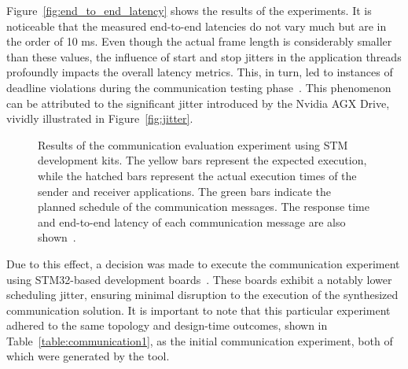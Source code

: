     Figure~\ref{fig:end_to_end_latency} shows the results of the experiments. It is noticeable that the measured end-to-end latencies do not vary much but are in the order of 10 ms.
    Even though the actual frame length is considerably smaller than these values, the influence of start and stop jitters in the application threads profoundly impacts the overall latency metrics. This, in turn, led to instances of deadline violations during the communication testing phase~\cite{askaripoor2023designer}. This phenomenon can be attributed to the significant jitter introduced by the Nvidia AGX Drive, vividly illustrated in Figure~\ref{fig:jitter}.
         \begin{figure}[b!]
	\centering
	\caption{Results of the communication evaluation experiment using STM development kits. The yellow bars represent the expected execution, while the hatched bars represent the actual execution times of the sender and receiver applications. The green bars indicate the planned schedule of the communication messages. The response time and end-to-end latency of each communication message are also shown~\cite{askaripoor2023designer}.}
	\label{fig:end_to_end_latency1}
    \end{figure}
    
    Due to this effect, a decision was made to execute the communication experiment using STM32-based development boards~\cite{STM}. These boards exhibit a notably lower scheduling jitter, ensuring minimal disruption to the execution of the synthesized communication solution. It is important to note that this particular experiment adhered to the same topology and design-time outcomes, shown in Table~\ref{table:communication1}, as the initial communication experiment, both of which were generated by the tool.
    
